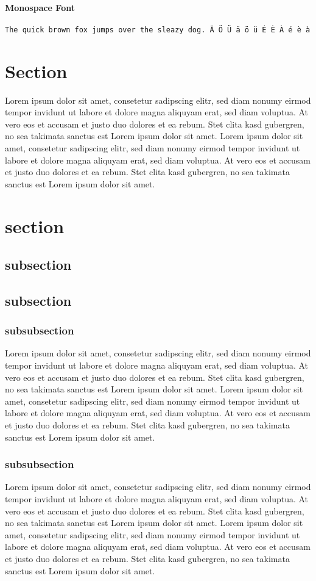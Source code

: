 \documentclass{breakthebox}
\begin{document}
\paragraph{Monospace Font}
\texttt{The quick brown fox jumps over the sleazy dog.  Ä Ö Ü ä ö ü É È À é è à  }

\section{Section}
Lorem ipsum dolor sit amet, consetetur sadipscing elitr, sed diam nonumy eirmod tempor invidunt ut labore et dolore magna aliquyam erat, sed diam voluptua. At vero eos et accusam et justo duo dolores et ea rebum. Stet clita kasd gubergren, no sea takimata sanctus est Lorem ipsum dolor sit amet. Lorem ipsum dolor sit amet, consetetur sadipscing elitr, sed diam nonumy eirmod tempor invidunt ut labore et dolore magna aliquyam erat, sed diam voluptua. At vero eos et accusam et justo duo dolores et ea rebum. Stet clita kasd gubergren, no sea takimata sanctus est Lorem ipsum dolor sit amet.
\section{section}
\subsection{subsection}
\subsection{subsection}
\subsubsection{subsubsection}
Lorem ipsum dolor sit amet, consetetur sadipscing elitr, sed diam nonumy eirmod tempor invidunt ut labore et dolore magna aliquyam erat, sed diam voluptua. At vero eos et accusam et justo duo dolores et ea rebum. Stet clita kasd gubergren, no sea takimata sanctus est Lorem ipsum dolor sit amet. Lorem ipsum dolor sit amet, consetetur sadipscing elitr, sed diam nonumy eirmod tempor invidunt ut labore et dolore magna aliquyam erat, sed diam voluptua. At vero eos et accusam et justo duo dolores et ea rebum. Stet clita kasd gubergren, no sea takimata sanctus est Lorem ipsum dolor sit amet.

\subsubsection{subsubsection}
Lorem ipsum dolor sit amet, consetetur sadipscing elitr, sed diam nonumy eirmod tempor invidunt ut labore et dolore magna aliquyam erat, sed diam voluptua. At vero eos et accusam et justo duo dolores et ea rebum. Stet clita kasd gubergren, no sea takimata sanctus est Lorem ipsum dolor sit amet. Lorem ipsum dolor sit amet, consetetur sadipscing elitr, sed diam nonumy eirmod tempor invidunt ut labore et dolore magna aliquyam erat, sed diam voluptua. At vero eos et accusam et justo duo dolores et ea rebum. Stet clita kasd gubergren, no sea takimata sanctus est Lorem ipsum dolor sit amet.
\end{document}
